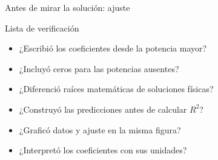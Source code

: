 \documentclass[10pt]{beamer}
\begin{document}
\begin{frame}{Antes de mirar la solución: ajuste}
  \begin{block}{Lista de verificación}
    \begin{itemize}
      \item ¿Escribió los coeficientes desde la potencia mayor?
      \item ¿Incluyó ceros para las potencias ausentes?
      \item ¿Diferenció raíces matemáticas de soluciones físicas?
      \item ¿Construyó las predicciones antes de calcular \(R^2\)?
      \item ¿Graficó datos y ajuste en la misma figura?
      \item ¿Interpretó los coeficientes con sus unidades?
    \end{itemize}
  \end{block}
\end{frame}
\end{document}
